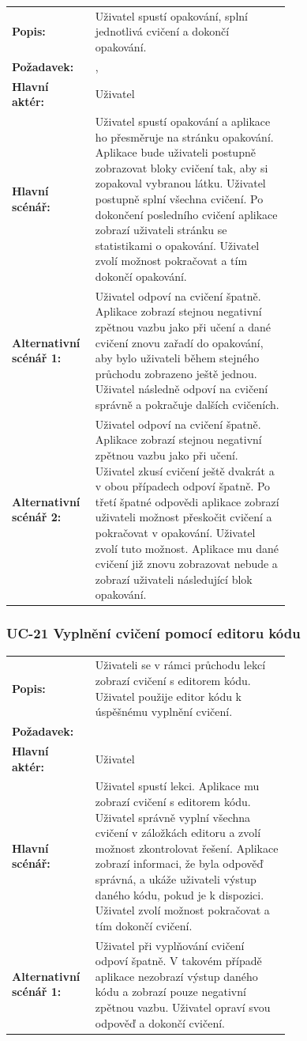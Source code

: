 \begin{tabular}{lp{0.7\linewidth}}
  \textbf{Popis:} & Uživatel spustí opakování, splní jednotlivá cvičení a dokončí opakování. \\
  \textbf{Požadavek:} & \nameref{sec:fp-learning-structure}, \nameref{sec:fp-exercise-blocks} \\
  \textbf{Hlavní aktér:} & Uživatel \\
  \textbf{Hlavní scénář:} & Uživatel spustí opakování a aplikace ho přesměruje na stránku opakování. Aplikace bude uživateli postupně zobrazovat bloky cvičení tak, aby si zopakoval vybranou látku. Uživatel postupně splní všechna cvičení. Po dokončení posledního cvičení aplikace zobrazí uživateli stránku se statistikami o opakování. Uživatel zvolí možnost pokračovat a tím dokončí opakování. \\
  \textbf{Alternativní scénář 1:} & Uživatel odpoví na cvičení špatně. Aplikace zobrazí stejnou negativní zpětnou vazbu jako při učení a dané cvičení znovu zařadí do opakování, aby bylo uživateli během stejného průchodu zobrazeno ještě jednou. Uživatel následně odpoví na cvičení správně a pokračuje dalších cvičeních. \\
  \textbf{Alternativní scénář 2:} & Uživatel odpoví na cvičení špatně. Aplikace zobrazí stejnou negativní zpětnou vazbu jako při učení. Uživatel zkusí cvičení ještě dvakrát a v obou případech odpoví špatně. Po třetí špatné odpovědi aplikace zobrazí uživateli možnost přeskočit cvičení a pokračovat v opakování. Uživatel zvolí tuto možnost. Aplikace mu dané cvičení již znovu zobrazovat nebude a zobrazí uživateli následující blok opakování. \\
\end{tabular}


\subsubsection{UC-21 Vyplnění cvičení pomocí editoru kódu}

\begin{tabular}{lp{0.7\linewidth}}
  \textbf{Popis:} & Uživateli se v rámci průchodu lekcí zobrazí cvičení s editorem kódu. Uživatel použije editor kódu k úspěšnému vyplnění cvičení.  \\
  \textbf{Požadavek:} & \nameref{sec:fp-code-editor} \\
  \textbf{Hlavní aktér:} & Uživatel \\
  \textbf{Hlavní scénář:} & Uživatel spustí lekci. Aplikace mu zobrazí cvičení s editorem kódu. Uživatel správně vyplní všechna cvičení v záložkách editoru a zvolí možnost zkontrolovat řešení. Aplikace zobrazí informaci, že byla odpověď správná, a ukáže uživateli výstup daného kódu, pokud je k dispozici. Uživatel zvolí možnost pokračovat a tím dokončí cvičení. \\
  \textbf{Alternativní scénář 1:} & Uživatel při vyplňování cvičení odpoví špatně. V takovém případě aplikace nezobrazí výstup daného kódu a zobrazí pouze negativní zpětnou vazbu. Uživatel opraví svou odpověď a dokončí cvičení. \\
\end{tabular}

